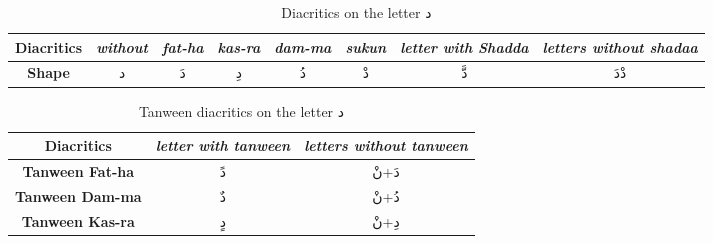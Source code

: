 \begin{table}[h]
  \centering
  \begin{tabular}{c c c c c c c c}
    \toprule
    \textbf{\small{Diacritics}}     & \small{\textit{without}} & \small{\textit{fat-ha}} &
                                                                                           \small{\textit{kas-ra}} & \small{\textit{dam-ma}} & \small{\textit{sukun}} & \small{\textit{letter with Shadda }} & \small{\textit{letters without shadaa  }} \\
    \midrule
    \textbf{\small{Shape}}   & \textarabic{د} & \textarabic{دَ} & \textarabic{دِ} &
                                                                                  \textarabic{دُ} & \textarabic{دْ}  & \textarabic{دَّ} &  \textarabic{دْدَ}\\
    \bottomrule
  \end{tabular}
  \caption{Diacritics on the letter  \textarabic{ د }}\label{Tab:Diacritics_Dal}
\end{table}
\begin{table}[h]
  \centering
  \begin{tabular}{c c c}
    \toprule
    \textbf{\small{Diacritics}} & \small{\textit{letter with tanween }} & \small{\textit{letters without tanween}} \\
    \midrule
    \textbf{\small{Tanween Fat-ha}}  & \textarabic{دً} &  \textarabic{دَ+نْ}\\
    \textbf{\small{Tanween Dam-ma}}  & \textarabic{دٌ} &  \textarabic{دُ+نْ}\\
    \textbf{\small{Tanween Kas-ra}}  & \textarabic{دٍ} &  \textarabic{دِ+نْ}\\
    \bottomrule
  \end{tabular}
  \caption{Tanween diacritics on the letter  \textarabic{ د }} \label{Tab:Tanween_Dal}
\end{table}%


